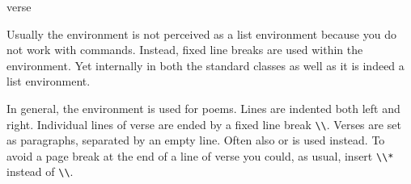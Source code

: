   \begin{Declaration}
    \begin{Environment}{verse}\end{Environment}
  \end{Declaration}%
  Usually the  environment is not perceived as a list
  environment because you do not work with  commands. Instead,
  fixed line breaks are used within the 
  environment. Yet internally in both the standard classes as well as
  {\KOMAScript} it is indeed a list environment.

  In general, the  environment is used for
  poems.  Lines are indented both left and right. Individual
  lines of verse are ended by a fixed line break \verb|\\|. Verses are set as
  paragraphs, separated by an empty line. Often also
   or  is
  used instead. To avoid a page break at the end of a line of verse you could,
  as usual, insert \verb|\\*| instead of \verb|\\|.
